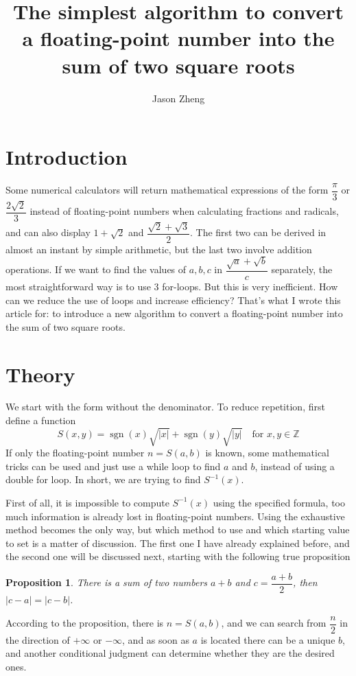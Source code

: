 \documentclass[a4paper]{article}
\title{The simplest algorithm to convert a floating-point number into the sum of two square roots}
\author{Jason Zheng}
\newtheorem{proposition}{Proposition}
\DeclareMathOperator{\sgn}{\mathrm{sgn}}
\begin{document}
\maketitle

\section{Introduction}
Some numerical calculators will return mathematical expressions of the form $\dfrac{\pi}{3}$ or $\dfrac{2\sqrt{2}}{3}$ instead of floating-point numbers when calculating fractions and radicals, and can also display $1+\sqrt{2}$ and $\dfrac{\sqrt{2}+\sqrt{3}}{2}$. The first two can be derived in almost an instant by simple arithmetic, but the last two involve addition operations. If we want to find the values of $a,b,c$ in $\dfrac{\sqrt{a}+\sqrt{b}}{c}$ separately, the most straightforward way is to use 3 for-loops. But this is very inefficient. How can we reduce the use of loops and increase efficiency? That's what I wrote this article for: to introduce a new algorithm to convert a floating-point number into the sum of two square roots.

\section{Theory}
We start with the form without the denominator. To reduce repetition, first define a function\[S(x,y)=\sgn(x)\sqrt{|x|}+\sgn(y)\sqrt{|y|} \quad\text{for } x,y\in\mathbb{Z}\]If only the floating-point number $n=S(a,b)$ is known, some mathematical tricks can be used and just use a while loop to find $a$ and $b$, instead of using a double for loop. In short, we are trying to find $S^{-1}(x)$.

First of all, it is impossible to compute $S^{-1}(x)$ using the specified formula, too much information is already lost in floating-point numbers. Using the exhaustive method becomes the only way, but which method to use and which starting value to set is a matter of discussion. The first one I have already explained before, and the second one will be discussed next, starting with the following true proposition
\begin{proposition}
    There is a sum of two numbers $a+b$ and $c=\dfrac{a+b}{2}$, then $|c-a|=|c-b|$.
\end{proposition}

According to the proposition, there is $n=S(a,b)$, and we can search from $\dfrac{n}{2}$ in the direction of $+\infty$ or $-\infty$, and as soon as $a$ is located there can be a unique $b$, and another conditional judgment can determine whether they are the desired ones.
\end{document}
